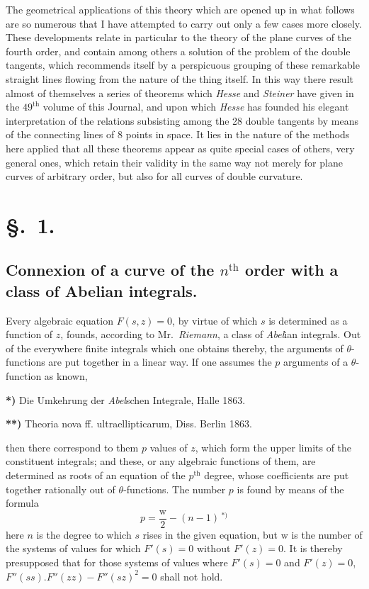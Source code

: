 \documentclass{article}
\begin{document}
The geometrical applications of this theory which are opened up in what follows are so numerous that I have attempted to carry out only a few cases more closely. These developments relate in particular to the theory of the plane curves of the fourth order, and contain among others a solution of the problem of the double tangents, which recommends itself by a perspicuous grouping of these remarkable straight lines flowing from the nature of the thing itself. In this way there result almost of themselves a series of theorems which \emph{Hesse} and \emph{Steiner} have given in the $49^{\text{th}}$ volume of this Journal, and upon which \emph{Hesse} has founded his elegant interpretation of the relations subsisting among the 28 double tangents by means of the connecting lines of 8 points in space. It lies in the nature of the methods here applied that all these theorems appear as quite special cases of others, very general ones, which retain their validity in the same way not merely for plane curves of arbitrary order, but also for all curves of double curvature.

\section*{§.~1.}
\subsection*{Connexion of a curve of the $n^{\text{th}}$ order with a class of Abelian integrals.}

Every algebraic equation $F(s, z) = 0$, by virtue of which $s$ is determined as a function of $z$, founds, according to Mr.\ \emph{Riemann}, a class of \emph{Abel}ian integrals. Out of the everywhere finite integrals which one obtains thereby, the arguments of $\theta$-functions are put together in a linear way. If one assumes the $p$ arguments of a $\theta$-function as known,

\textbf{*)} Die Umkehrung der \emph{Abel}schen Integrale, Halle 1863.

\textbf{**)} Theoria nova ff. ultraellipticarum, Diss. Berlin 1863.

then there correspond to them $p$ values of $z$, which form the upper limits of the constituent integrals; and these, or any algebraic functions of them, are determined as roots of an equation of the $p^{\text{th}}$ degree, whose coefficients are put together rationally out of $\theta$-functions. The number $p$ is found by means of the formula
\[ p = \frac{\mathrm{w}}{2} - (n-1)\,{}^{*)} \]
here $n$ is the degree to which $s$ rises in the given equation, but $\mathrm{w}$ is the number of the systems of values for which $F'(s) = 0$ without $F'(z) = 0$. It is thereby presupposed that for those systems of values where $F'(s) = 0$ and $F'(z) = 0$, $F''(ss).F''(zz) - F''(sz)^{2} = 0$ shall not hold.
\end{document}
